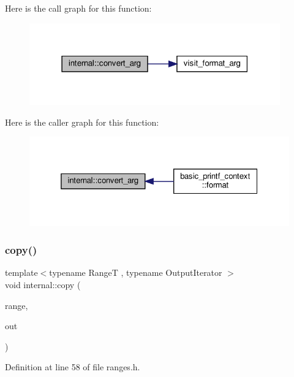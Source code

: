 Here is the call graph for this function\+:
\nopagebreak
\begin{figure}[H]
\begin{center}
\leavevmode
\includegraphics[width=307pt]{namespaceinternal_a51007b037fc1ae75f525ff89401ec56b_cgraph}
\end{center}
\end{figure}
Here is the caller graph for this function\+:
\nopagebreak
\begin{figure}[H]
\begin{center}
\leavevmode
\includegraphics[width=325pt]{namespaceinternal_a51007b037fc1ae75f525ff89401ec56b_icgraph}
\end{center}
\end{figure}
\mbox{\label{namespaceinternal_a03b2086b2426ff3ecfce2d6fd22b66dc}} 
\subsubsection{\texorpdfstring{copy()}{copy()}\hspace{0.1cm}{\footnotesize\ttfamily [1/3]}}
{\footnotesize\ttfamily template$<$typename RangeT , typename Output\+Iterator $>$ \\
void internal\+::copy (\begin{DoxyParamCaption}\item[{const RangeT \&}]{range,  }\item[{Output\+Iterator}]{out }\end{DoxyParamCaption})}



Definition at line 58 of file ranges.\+h.

